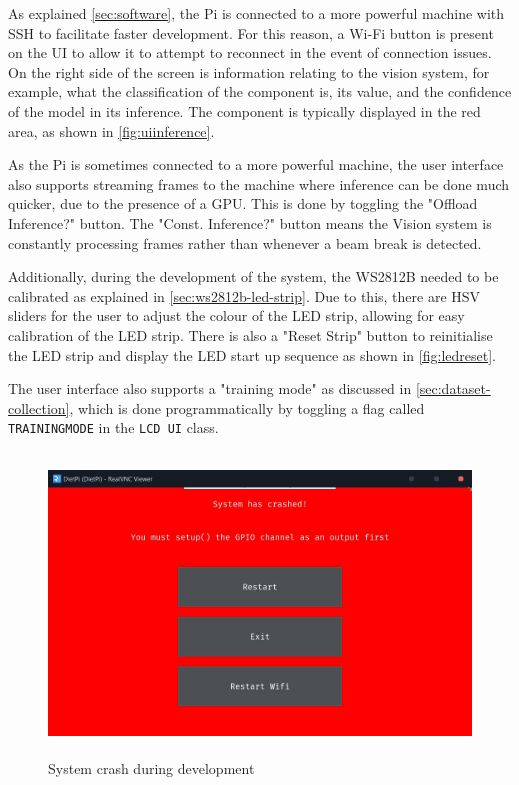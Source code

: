 As explained \autoref{sec:software}, the Pi is connected to a more powerful machine with SSH to facilitate faster development. For this reason, a Wi-Fi button is present on the UI to allow it to attempt to reconnect in the event of connection issues. On the right side of the screen is information relating to the vision system, for example, what the classification of the component is, its value, and the confidence of the model in its inference. The component is typically displayed in the red area, as shown in \autoref{fig:uiinference}.

As the Pi is sometimes connected to a more powerful machine, the user interface also supports streaming frames to the machine where inference can be done much quicker, due to the presence of a GPU. This is done by toggling the "Offload Inference?" button. The "Const. Inference?" button means the Vision system is constantly processing frames rather than whenever a beam break is detected.

Additionally, during the development of the system, the WS2812B needed to be calibrated as explained in \autoref{sec:ws2812b-led-strip}. Due to this, there are HSV sliders for the user to adjust the colour of the LED strip, allowing for easy calibration of the LED strip. There is also a "Reset Strip" button to reinitialise the LED strip and display the LED start up sequence as shown in \autoref{fig:ledreset}.

The user interface also supports a "training mode" as discussed in \autoref{sec:dataset-collection}, which is done programmatically by toggling a flag called \texttt{TRAININGMODE} in the \texttt{LCD UI} class.
\begin{figure}[H]
    \hfill
    \begin{minipage}[t]{\textwidth}
      \centering
      \includegraphics[height=8cm]{imgs/python/systemcrash.jpg}
      \caption{System crash during development}
      \label{fig:crash}
    \end{minipage}
\end{figure}

